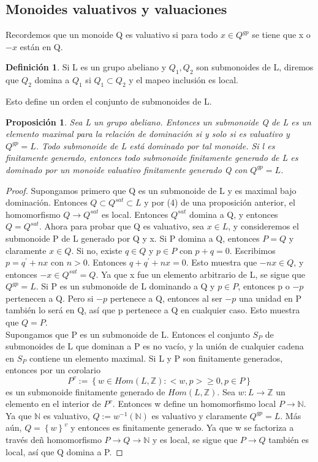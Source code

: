 \documentclass[12pt,spanish]{amsart}
\newcommand{\bb}[1]{\mathbb{#1}}
\newcommand{\set}[1]{\left\{{#1}\right\}}
\newtheorem{prop}[Theorem]{Proposición}
\theoremstyle{definition}
\newtheorem{Def}[Theorem]{Definición}
\theoremstyle{remark}
\begin{document}
\subsection{Monoides valuativos y valuaciones}
Recordemos que un monoide Q es valuativo si para todo $x\in Q^{gp}$ se tiene que x o $-x$ están en Q. \\

\begin{Def}
Si L es un grupo abeliano y $Q_{1},Q_{2}$ son submonoides de L, diremos que $Q_{2}$ domina a $Q_{1}$ si $Q_{1} \subset Q_{2}$ y el mapeo inclusión es local. 
\end{Def}

Esto define un orden el conjunto de submonoides de L. 


\begin{prop}
Sea L un grupo abeliano. Entonces un submonoide Q de L es un elemento maximal para la relación de dominación si y solo si es valuativo y $Q^{gp}=L$. Todo submonoide de L está dominado por tal monoide. Si l es finitamente generado, entonces todo submonoide finitamente generado de L es dominado por un monoide valuativo finitamente generado Q con $Q^{gp}=L$. 
\end{prop}

\begin{proof}
Supongamos primero que Q es un submonoide de L y es maximal bajo dominación. Entonces $Q \subset Q^{sat} \subset L$ y por (4) de una proposición anterior, el homomorfismo $Q \to Q^{sat}$ es local. Entonces $Q^{sat}$ domina a Q, y entonces $Q=Q^{sat}$. Ahora para probar que Q es valuativo, sea $x\in L$, y consideremos el submonoide P de L generado por Q y x. Si P domina a Q, entonces $P=Q$ y claramente $x\in Q$. Si no, existe $q\in Q$ y $p\in P$ con $p+q=0$. Escribimos $p=q^{\prime}+nx$ con $n>0$. Entonces $q+q^{\prime}+nx=0$. Esto muestra que $-nx\in Q$, y entonces $-x\in Q^{sat}=Q$. Ya que x fue un elemento arbitrario de L, se sigue que $Q^{gp}=L$. Si P es un submonoide de L dominando a Q y $p\in P$, entonces p o $-p$ pertenecen a Q. Pero si $-p$ pertenece a Q, entonces al ser $-p$ una unidad en P también lo será en Q, así que p pertenece a Q en cualquier caso. Esto muestra que $Q=P$. \\ 
Supongamos que P es un submonoide de L. Entonces el conjunto $S_{P}$ de submonoides de L que dominan a P es no vacío, y la unión de cualquier cadena en $S_{P}$ contiene un elemento maximal. Si L y P son finitamente generados, entonces por un corolario
$$P^{v}:= \set{w\in Hom(L,\bb{Z}):<w,p> \geq 0,p\in P}$$
es un submonoide finitamente generado de $Hom(L,\bb{Z})$. Sea $w:L \to \bb{Z}$ un elemento en el interior de $P^{v}$. Entonces w define un homomorfismo local $P \to \bb{N}$. Ya que $\bb{N}$ es valuativo, $Q:=w^{-1}(\bb{N})$ es valuativo y claramente $Q^{gp}=L$. Más aún, $Q=\set{w}^{v}$ y entonces es finitamente generado. Ya que w se factoriza a través deñ homomorfismo $P \to Q \to \bb{N}$ y es local, se sigue que $P \to Q$ también es local, así que Q domina a P.
\end{proof}
\end{document}
